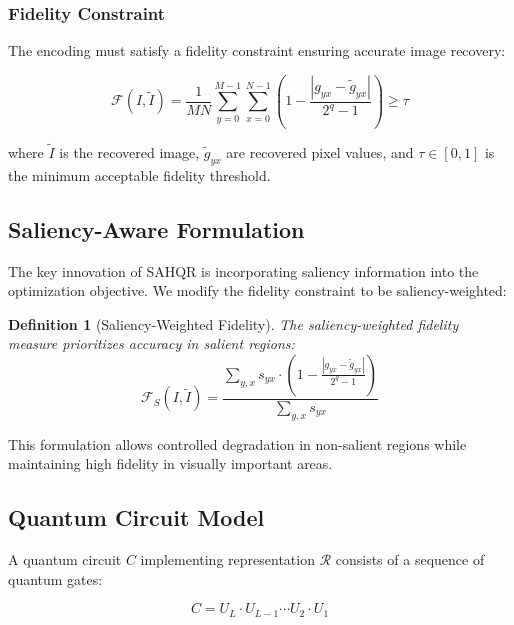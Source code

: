 \documentclass[pdflatex,sn-mathphys-num,Numbered]{sn-jnl}
\theoremstyle{thmstyleone}
\theoremstyle{thmstyletwo}
\theoremstyle{thmstylethree}
\newtheorem{definition}{Definition}
\begin{document}
\subsubsection{Fidelity Constraint}

The encoding must satisfy a fidelity constraint ensuring accurate image recovery:

\begin{equation}
\mathcal{F}(I, \tilde{I}) = \frac{1}{MN} \sum_{y=0}^{M-1} \sum_{x=0}^{N-1} \left(1 - \frac{|g_{yx} - \tilde{g}_{yx}|}{2^q - 1}\right) \geq \tau
\label{eq:fidelity}
\end{equation}

where $\tilde{I}$ is the recovered image, $\tilde{g}_{yx}$ are recovered pixel values, and $\tau \in [0, 1]$ is the minimum acceptable fidelity threshold.

\subsection{Saliency-Aware Formulation}

The key innovation of SAHQR is incorporating saliency information into the optimization objective. We modify the fidelity constraint to be saliency-weighted:

\begin{definition}[Saliency-Weighted Fidelity]
The saliency-weighted fidelity measure prioritizes accuracy in salient regions:
\begin{equation}
\mathcal{F}_S(I, \tilde{I}) = \frac{\sum_{y,x} s_{yx} \cdot \left(1 - \frac{|g_{yx} - \tilde{g}_{yx}|}{2^q - 1}\right)}{\sum_{y,x} s_{yx}}
\label{eq:saliency_fidelity}
\end{equation}
\end{definition}

This formulation allows controlled degradation in non-salient regions while maintaining high fidelity in visually important areas.

\subsection{Quantum Circuit Model}

A quantum circuit $C$ implementing representation $\mathcal{R}$ consists of a sequence of quantum gates:

\begin{equation}
C = U_L \cdot U_{L-1} \cdots U_2 \cdot U_1
\label{eq:circuit}
\end{equation}
\end{document}
